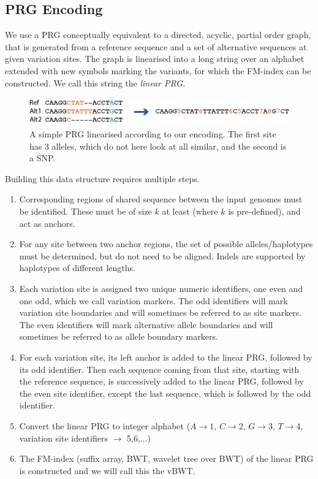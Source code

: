 \documentclass[runningheads,a4paper]{llncs}
\begin{document}
\subsection{PRG Encoding}



We use a  PRG conceptually equivalent to a directed, acyclic, partial order graph, that is generated from a reference sequence and a set of alternative sequences at given variation sites. The graph is linearised into a long string over an alphabet extended with new symbols marking the variants, for which the FM-index can be constructed. We call this string the \textit{linear PRG}.


\begin{figure}
\centering
\includegraphics[height=1.2cm]{fig2_encoding.png}
\caption{A simple PRG linearised according to our encoding. The first site has 3 alleles, which do not here look at all similar, and the second is a SNP.}
\label{lab3}
\end{figure}



Building this data structure requires multiple steps. 
\begin{enumerate}
\item Corresponding regions of shared sequence between the input  genomes must be identified. These must be of size $k$ at least (where $k$ is pre-defined), and  act as anchors. 
\item For any site between two anchor regions, the set of possible alleles/haplotypes must be determined, but  do not need to be aligned. Indels are supported by haplotypes of different lengths.
\item Each variation site is assigned two unique numeric identifiers, one even and one odd, which we call variation markers. The odd identifiers will mark variation site boundaries and will sometimes be referred to as site markers. The even identifiers will mark alternative allele boundaries and will sometimes be referred to as allele boundary markers.
\item For each variation site, its left anchor is added to the linear PRG, followed by its odd identifier. Then each sequence coming from that site, starting with the reference sequence, is successively added to the linear PRG, followed by the even site identifier, except the last sequence, which is followed by the odd identifier.
\item Convert the linear PRG to integer alphabet ($A\rightarrow 1$, $C\rightarrow2$, $G\rightarrow3$, $T\rightarrow4$, variation site identifiers $\rightarrow$ 5,6,...)
\item The FM-index (suffix array, BWT, wavelet tree over BWT) of the linear PRG is constructed and we will call this the vBWT.
\end{enumerate}
\end{document}
